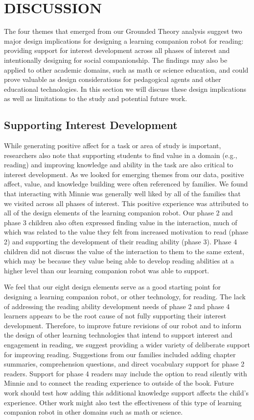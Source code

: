 \documentclass{sigchi}
\begin{document}
\section{DISCUSSION}
The four themes that emerged from our Grounded Theory analysis suggest two major design implications for designing a learning companion robot for reading: providing support for interest development across all phases of interest and intentionally designing for social companionship. The findings may also be applied to other academic domains, such as math or science education, and could prove valuable as design considerations for pedagogical agents and other educational technologies. In this section we will discuss these design implications as well as limitations to the study and potential future work.

\subsection{Supporting Interest Development}
While generating positive affect for a task or area of study is important, researchers also note that supporting students to find value in a domain (e.g., reading) and improving knowledge and ability in the task are also critical to interest development. As we looked for emerging themes from our data, positive affect, value, and knowledge building were often referenced by families. We found that interacting with Minnie was generally well liked by all of the families that we visited across all phases of interest. This positive experience was attributed to all of the design elements of the learning companion robot. Our phase 2 and phase 3 children also often expressed finding value in the interaction, much of which was related to the value they felt from increased motivation to read (phase 2) and supporting the development of their reading ability (phase 3). Phase 4 children did not discuss the value of the interaction to them to the same extent, which may be because they value being able to develop reading abilities at a higher level than our learning companion robot was able to support. 

We feel that our eight design elements serve as a good starting point for designing a learning companion robot, or other technology, for reading. The lack of addressing the reading ability development needs of phase 2 and phase 4 learners appears to be the root cause of not fully supporting their interest development. Therefore, to improve future revisions of our robot and to inform the design of other learning technologies that intend to support interest and engagement in reading, we suggest providing a wider variety of deliberate support for improving reading. Suggestions from our families included adding chapter summaries, comprehension questions, and direct vocabulary support for phase 2 readers. Support for phase 4 readers may include the option to read silently with Minnie and to connect the reading experience to outside of the book. Future work should test how adding this additional knowledge support affects the child's experience. Other work might also test the effectiveness of this type of learning companion robot in other domains such as math or science.
\end{document}
